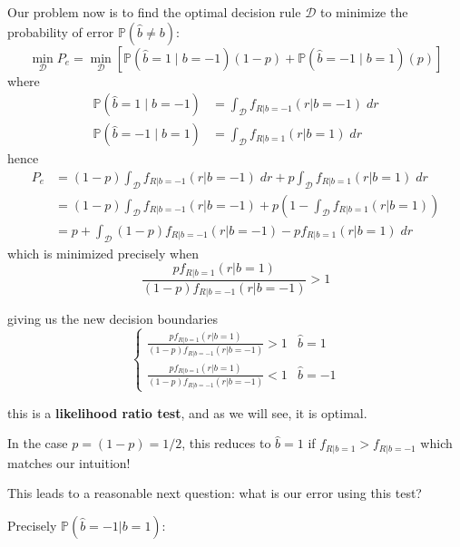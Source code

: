 \documentclass[12pt]{report}
\renewcommand{\hat}[1]{\widehat{#1}}
\renewcommand{\P}{\mathbb{P}}
\newcommand{\Ec}{\mathcal{E}}
\newcommand*{\tbf}[1]{\ifmmode\mathbf{#1}\else\textbf{#1}\fi}
\begin{document}
Our problem now is to find the optimal decision rule $\mathcal D$ to minimize the probability of error $\P(\hat b \neq b)$: 
\[\min_{\mathcal D} P_e = \min_{\mathcal D} \left[\P(\hat b = 1 \; | \; b = -1) (1- p) + \P(\hat b = -1 \; | \; b = 1) (p)\right]\]
where 
\begin{align*}
    \P(\hat b = 1 \; | \; b = -1) &= \int_{\mathcal D} f_{R | b = -1}(r | b = -1)\; dr\\ 
    \P(\hat b = -1 \; | \; b = 1) &= \int_{\mathcal D} f_{R | b= 1} (r | b = 1)\; dr
\end{align*}
hence  
\begin{align*}
    P_e &= (1 - p)\int_{\mathcal D} f_{R | b = -1}(r | b = -1)\; dr + p \int_{\mathcal D} f_{R | b= 1} (r | b = 1)\; dr\\ 
    &= (1 - p)\int_{\mathcal D} f_{R | b = -1}(r | b = -1) + p \left(1 - \int_{\mathcal D} f_{R | b = 1}(r | b = 1)\right) \\ 
    &= p + \int_{\mathcal D} (1 - p) f_{R | b= -1} (r | b = -1) - p f_{R | b=1}(r | b=1)\; dr
\end{align*}
which is minimized precisely when 
\[\frac{p f_{R | b=1}(r | b=1) }{(1 - p) f_{R | b= -1} (r | b = -1)} > 1\]

giving us the new decision boundaries 
\[\begin{cases}
    \frac{p f_{R | b=1}(r | b=1) }{(1 - p) f_{R | b= -1} (r | b = -1)} > 1 & \hat b = 1\\ 
    \frac{p f_{R | b=1}(r | b=1) }{(1 - p) f_{R | b= -1} (r | b = -1)} < 1 & \hat b = -1
\end{cases}\]

this is a \tbf{likelihood ratio test}, and as we will see, it is optimal. 

In the case $p = (1 - p) = 1/2$, this reduces to $\hat b = 1$ if $f_{R | b = 1} > f_{R | b= -1}$ which matches our intuition! 

This leads to a reasonable next question: what is our error using this test? 

Precisely $\P(\hat b = -1 | b= 1)$:
\begin{center}
\end{center}
\end{document}
